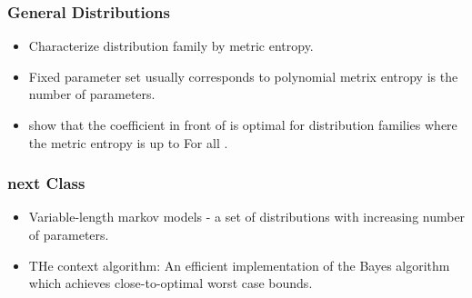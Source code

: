 \documentclass[handout]{beamer}
\begin{document}
\begin{frame}
\frametitle{General Distributions}
\begin{itemize}
\item Characterize distribution family by metric entropy.
\item Fixed parameter set usually corresponds to polynomial metrix
  entropy
\R{ \[
N(1/\epsilon) = O\paren{\frac{1}{\epsilon^d}}
\]}
 is the number of parameters.
\item
{} show that the coefficient in front of  is optimal for distribution families where the metric entropy is
  up to 
\R{\[ 
N(1/\epsilon) = O\paren{e^{\epsilon^{-\alpha}}}
\]}
For all .
\end{itemize}
\end{frame}

\begin{frame}
\frametitle{next Class}
\begin{itemize}
\item Variable-length markov models - a set of distributions with
  increasing number of parameters.
\item THe context algorithm: An efficient implementation of the Bayes
  algorithm which achieves close-to-optimal worst case bounds.
\end{itemize}
\end{frame}

\iffalse %
\begin{frame}
\frametitle{XXX}
\begin{itemize}
\item XXX
\end{itemize}
\end{frame}

\fi %
\end{document}
